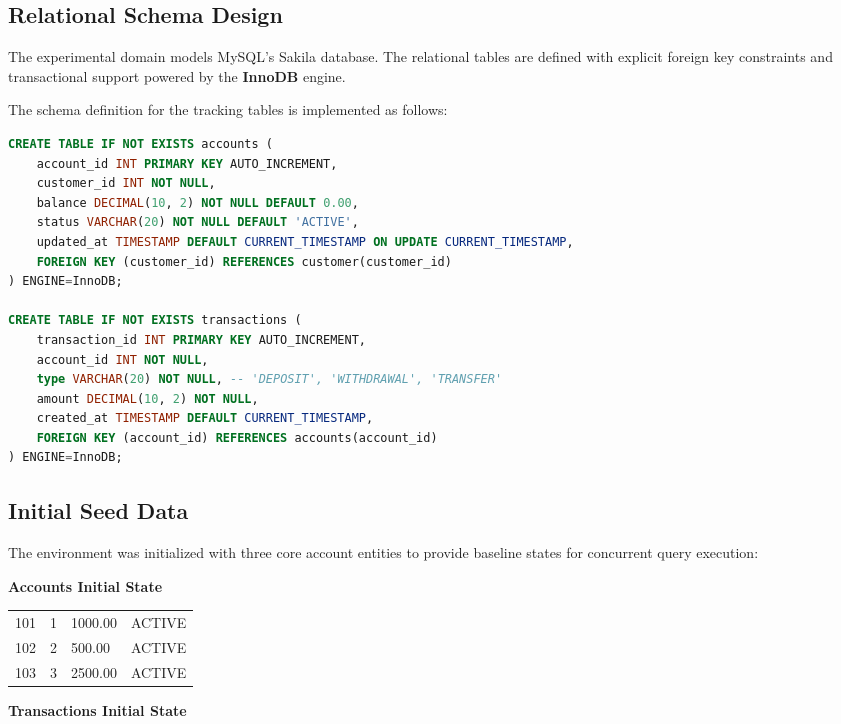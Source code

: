 \documentclass[sigconf, pbalance, nonacm]{acmart}
\begin{document}
\subsection {Relational Schema Design}
The experimental domain models MySQL's Sakila database. The relational tables are defined with explicit foreign key constraints and transactional support powered by the \textbf{InnoDB} engine. 

The schema definition for the tracking tables is implemented as follows:

\begin{lstlisting}[language=SQL, caption={DDL Schema Definition for Accounts and Transactions}]
CREATE TABLE IF NOT EXISTS accounts (
    account_id INT PRIMARY KEY AUTO_INCREMENT,
    customer_id INT NOT NULL,
    balance DECIMAL(10, 2) NOT NULL DEFAULT 0.00,
    status VARCHAR(20) NOT NULL DEFAULT 'ACTIVE',
    updated_at TIMESTAMP DEFAULT CURRENT_TIMESTAMP ON UPDATE CURRENT_TIMESTAMP,
    FOREIGN KEY (customer_id) REFERENCES customer(customer_id)
) ENGINE=InnoDB;

CREATE TABLE IF NOT EXISTS transactions (
    transaction_id INT PRIMARY KEY AUTO_INCREMENT,
    account_id INT NOT NULL,
    type VARCHAR(20) NOT NULL, -- 'DEPOSIT', 'WITHDRAWAL', 'TRANSFER'
    amount DECIMAL(10, 2) NOT NULL,
    created_at TIMESTAMP DEFAULT CURRENT_TIMESTAMP,
    FOREIGN KEY (account_id) REFERENCES accounts(account_id)
) ENGINE=InnoDB;
\end{lstlisting} 

\subsection{Initial Seed Data}
The environment was initialized with three core account entities to provide baseline states for concurrent query execution:

\smallskip

\noindent\textbf{Accounts Initial State}
\smallskip

\noindent
\begin{tabularx}{\columnwidth}{XXXX}
101 & 1 & 1000.00 & ACTIVE \\
102 & 2 & 500.00  & ACTIVE \\
103 & 3 & 2500.00 & ACTIVE \\
\end{tabularx}

\vspace{0.4cm} 

\noindent\textbf{Transactions Initial State}
\smallskip
\end{document}
